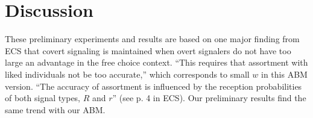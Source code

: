 \documentclass[11pt,letterpaper]{article}
\begin{document}
\section*{Discussion}

These preliminary experiments and results are based on one major finding from
ECS that covert signaling is maintained when overt signalers do not have
too large an advantage in the free choice context. ``This requires that
assortment with liked individuals not be too accurate,'' which corresponds to
small $w$ in this ABM version. ``The accuracy of assortment is influenced
by the reception probabilities of both signal types, $R$ and $r$'' (see p.
4 in ECS). Our preliminary results find the same trend with our ABM.


% 


% 
\end{document}
